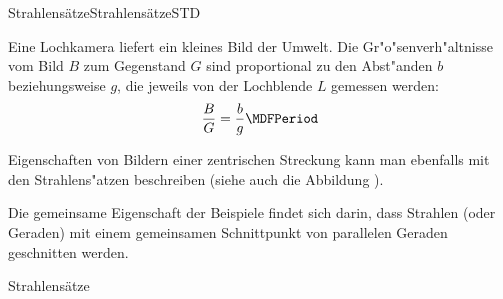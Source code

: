 \begin{MXContent}{Strahlens\"atze}{Strahlens\"atze}{STD}

Eine Lochkamera liefert ein kleines Bild der Umwelt. Die Gr"o"senverh"altnisse
vom Bild $B$ zum Gegenstand $G$ sind proportional zu den Abst"anden $b$ 
beziehungsweise $g$, die jeweils von der Lochblende $L$ gemessen werden:
\[
\frac{B}{G} = \frac{b}{g} \MDFPeriod %
\]
\begin{center}
\end{center}


Eigenschaften von Bildern einer zentrischen Streckung kann man ebenfalls
mit den Strahlens"atzen beschreiben (siehe auch die Abbildung 
).

Die gemeinsame Eigenschaft der Beispiele findet sich darin, dass Strahlen (oder 
Geraden) mit einem gemeinsamen Schnittpunkt von parallelen Geraden geschnitten
werden.


\begin{MXInfo}{Strahlens\"atze}%
%


\end{MXInfo}
\end{MXContent}
